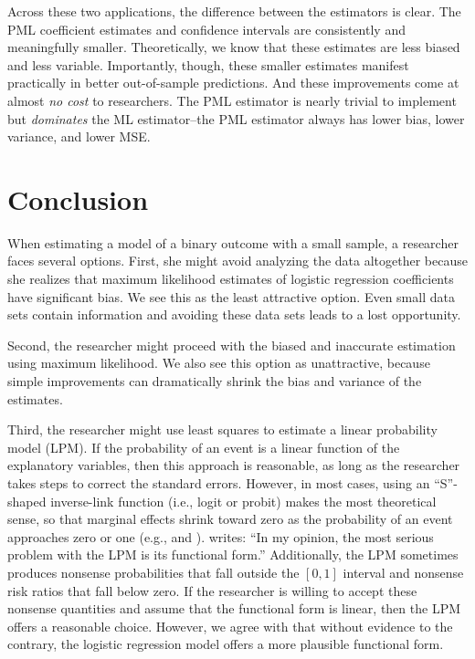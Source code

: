 \documentclass[12pt]{article}
\begin{document}
Across these two applications, the difference between the estimators is clear. 
The PML coefficient estimates and confidence intervals are consistently and meaningfully smaller. 
Theoretically, we know that these estimates are less biased and less variable.
Importantly, though, these smaller estimates manifest practically in better out-of-sample predictions.
And these improvements come at almost \textit{no cost} to researchers. 
The PML estimator is nearly trivial to implement but \textit{dominates} the ML estimator--the PML estimator always has lower bias, lower variance, and lower MSE.

\section*{Conclusion}

When estimating a model of a binary outcome with a small sample, a researcher faces several options. 
First, she might avoid analyzing the data altogether because she realizes that maximum likelihood estimates of logistic regression coefficients have significant bias.
We see this as the least attractive option.
Even small data sets contain information and avoiding these data sets leads to a lost opportunity.

Second, the researcher might proceed with the biased and inaccurate estimation using maximum likelihood.
We also see this option as unattractive, because simple improvements can dramatically shrink the bias and variance of the estimates.

Third, the researcher might use least squares to estimate a linear probability model (LPM). If the probability of an event is a linear function of the explanatory variables, then this approach is reasonable, as long as the researcher takes steps to correct the standard errors.
However, in most cases, using an ``S''-shaped inverse-link function (i.e., logit or probit) makes the most theoretical sense, so that marginal effects shrink toward zero as the probability of an event approaches zero or one (e.g.,
\citealt{BerryDeMerittEsarey2010} and \citealt[pp. 34-47]{Long1997}).
\citet[p. 40]{Long1997} writes: ``In my opinion, the most serious problem with the LPM is its functional form.''
Additionally, the LPM sometimes produces nonsense probabilities that fall outside the $[0, 1]$ interval and nonsense risk ratios that fall below zero.
If the researcher is willing to accept these nonsense quantities and assume that the functional form is linear, then the LPM offers a reasonable choice.
However, we agree with \cite{Long1997} that without evidence to the contrary, the logistic regression model offers a more plausible functional form.
\end{document}
